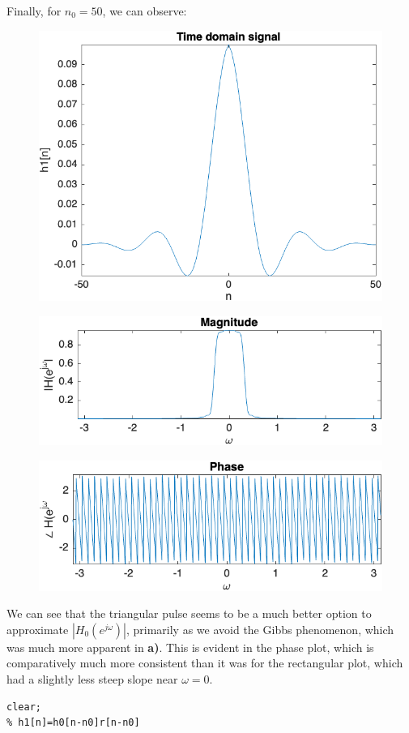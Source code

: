 \documentclass[12pt]{article}
\begin{document}
\begin{enumerate}[label=\textbf{\alph*)}, leftmargin=2.6em]
Finally, for $n_0=50$, we can observe:
\begin{figure} [H]
    \centering
    \includegraphics[width=0.75\linewidth]{16.png}
\end{figure}
\begin{figure} [H]
    \centering
    \includegraphics[width=0.75\linewidth]{17.png}
\end{figure}
\begin{figure} [H]
    \centering
    \includegraphics[width=0.75\linewidth]{18.png}
\end{figure}
We can see that the triangular pulse seems to be a much better option to approximate $|H_0(e^{j\omega})|$, primarily as we avoid the Gibbs phenomenon, which was much more apparent in \textbf{a)}. This is evident in the phase plot, which is comparatively much more consistent than it was for the rectangular plot, which had a slightly less steep slope near $\omega=0$.
\begin{verbatim}
clear;
% h1[n]=h0[n-n0]r[n-n0]


\end{verbatim}
\end{enumerate}
\end{document}
